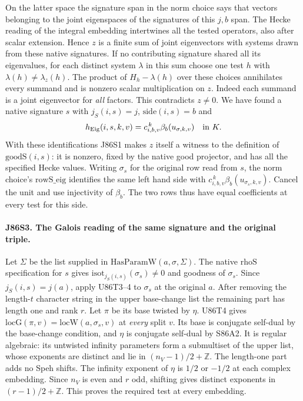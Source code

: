 On the latter space the signature span in the norm choice says that
vectors belonging to the joint eigenspaces of the signatures of this
$j,b$ span. The Hecke reading of the integral embedding intertwines
all the tested operators, also after scalar extension. Hence $z$ is
a finite sum of joint eigenvectors with systems drawn from these
native signatures. If no contributing signature shared all its
eigenvalues, for each distinct system $\lambda$ in this sum choose
one test $h$ with $\lambda(h)\ne\lambda_z(h)$. The product of
$H_h-\lambda(h)$ over these choices annihilates every summand
and is nonzero scalar multiplication on $z$. Indeed each summand
is a joint eigenvector for \emph{all} factors. This contradicts
$z\ne0$. We have found a native signature $s$ with
$j_S(i,s)=j$, $\mathrm{side}(i,s)=b$ and
\[
       h_{\rm Eig}(i,s,k,v)
             =c_{i,b,v}^{\,k}\beta_b(u_{\sigma,k,v})
             \quad\hbox{in }K .
\]
With these identifications J86S1 makes $z$ itself a witness to
the definition of $\mathrm{goodS}(i,s)$: it is nonzero, fixed by
the native good projector, and has all the specified Hecke values.
Writing $\sigma_s$ for the original row read from $s$, the norm
choice's $\mathrm{rowS\_eig}$ identifies the same left hand side
with $c_{i,b,v}^{\,k}\beta_b(u_{\sigma_s,k,v})$. Cancel the unit
and use injectivity of $\beta_b$. The two rows thus have equal
coefficients at every test for this side.

\paragraph{J86S3. The Galois reading of the same signature and the original triple.}
Let $\Sigma$ be the list supplied in $\mathrm{HasParamW}(a,\sigma,\Sigma)$.
The native $\mathrm{rhoS}$ specification for $s$ gives
$\mathrm{isot}_{j_S(i,s)}(\sigma_s)\ne0$ and goodness of $\sigma_s$.
Since $j_S(i,s)=j(a)$, apply U86T3--4 to $\sigma_s$ at the original
$a$. After removing the length-$t$ character string in the upper
base-change list the remaining part has length one and rank $r$.
Let $\pi$ be its base twisted by $\eta$. U86T4 gives
$\mathrm{locG}(\pi,v)=\mathrm{locW}(a,\sigma_s,v)$ at
\emph{every} split $v$. Its base is conjugate self-dual by the
base-change condition, and $\eta$ is conjugate self-dual by S86A2.
It is regular algebraic: its untwisted infinity parameters form a
submultiset of the upper list, whose exponents are distinct and lie
in $(n_V-1)/2+\mathbb Z$. The length-one part adds no Speh shifts.
The infinity exponent of $\eta$ is $1/2$ or $-1/2$ at each complex
embedding. Since $n_V$ is even and $r$ odd, shifting gives distinct
exponents in $(r-1)/2+\mathbb Z$. This proves the required test at
every embedding.


